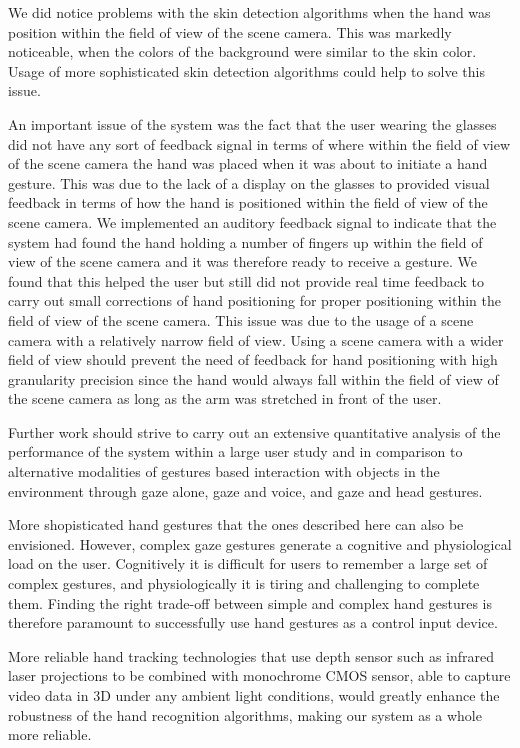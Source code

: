 \documentclass[jou,a4paper,notxfonts]{apa}
\begin{document}
We did notice problems with the skin detection algorithms when the hand was position within the field of view of the
scene camera. This was markedly noticeable, when the colors of the background were similar to the skin color. Usage of
more sophisticated skin detection algorithms could help to solve this issue.


An important issue of the system was the fact that the user wearing the glasses did not have any sort of feedback signal in
terms of where within the field of view of the scene camera the hand was placed when it was about to initiate a hand
gesture. This was due to the lack of a display on the glasses to provided visual feedback in terms of how the hand is
positioned within the field of view of the scene camera. We implemented an auditory feedback signal to indicate
that the system had found the hand holding a number of fingers up within the field of view of the scene camera and it was therefore ready to receive a
gesture. We found that this helped the user but still did not provide real time feedback to carry out small
corrections of hand positioning for proper positioning within the field of view of the scene camera. This issue was due
to the usage of a scene camera with a relatively narrow field of view. Using a scene camera with a wider field of view
should prevent the need of feedback for hand positioning with high granularity precision since the hand would always fall within the field of view of the scene camera as long as the arm was stretched in front of the user.
 

Further work should strive to carry out an extensive quantitative analysis of the performance of the system within a
large user study and in comparison to alternative modalities of gestures based interaction with objects in the environment through gaze alone, gaze and voice, and gaze and head gestures. 


More shopisticated hand gestures that the ones described here can also be envisioned. However, complex gaze gestures generate a
cognitive and physiological load on the user. Cognitively it is difficult for users to remember a large set of complex
gestures, and physiologically it is tiring and challenging to complete them. Finding the right trade-off between simple
and complex hand gestures is therefore paramount to successfully use hand gestures as a control input device.

More reliable hand tracking technologies that use depth sensor such as  infrared laser projections to be combined with monochrome CMOS sensor, able to capture video data in 3D under any ambient light conditions, would greatly enhance the robustness of the hand recognition algorithms, making our system as a whole more reliable.
\end{document}
